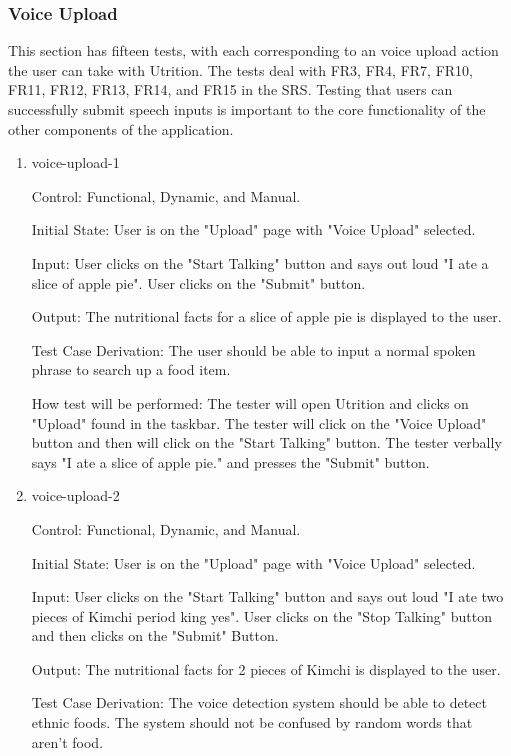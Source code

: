 \documentclass[12pt, titlepage]{article}
\begin{document}
	\subsubsection{Voice Upload}
	This section has fifteen tests, with each corresponding to an voice upload action the user can take with Utrition. The tests deal with FR3, FR4, FR7, FR10, FR11, FR12, FR13, FR14, and FR15 in the SRS. 
	Testing that users can successfully submit speech inputs is 
	important to the core functionality of the other components of the 
	application.
	
	\begin{enumerate}
	\item{voice-upload-1\\}
	
	Control: Functional, Dynamic, and Manual.
	
	Initial State: User is on the "Upload" page with "Voice Upload" selected.
	
	Input: User clicks on the "Start Talking" button and says out loud "I ate a slice of apple pie". User clicks on the "Submit" button.
	
	Output: The nutritional facts for a slice of apple pie is displayed to the user.
	
	Test Case Derivation: The user should be able to input a normal spoken phrase to search up a food item.
	
	How test will be performed: The tester will open Utrition and clicks on "Upload" found in the taskbar. The tester will click on the "Voice Upload" button and then will click on the "Start Talking" button. The tester verbally says "I ate a slice of apple pie." and presses the "Submit" button.
	
	\item{voice-upload-2\\}
	
	Control: Functional, Dynamic, and Manual.
	
	Initial State: User is on the "Upload" page with "Voice Upload" selected.
	
	Input: User clicks on the "Start Talking" button and says out loud "I ate two pieces of Kimchi period king yes". User clicks on the "Stop Talking" button and then clicks on the "Submit" Button.
	
	Output: The nutritional facts for 2 pieces of Kimchi is displayed to the user.
	
	Test Case Derivation: The voice detection system should be able to detect ethnic foods. The system should not be confused by random words that aren't food.
	

\end{enumerate}
\end{document}
